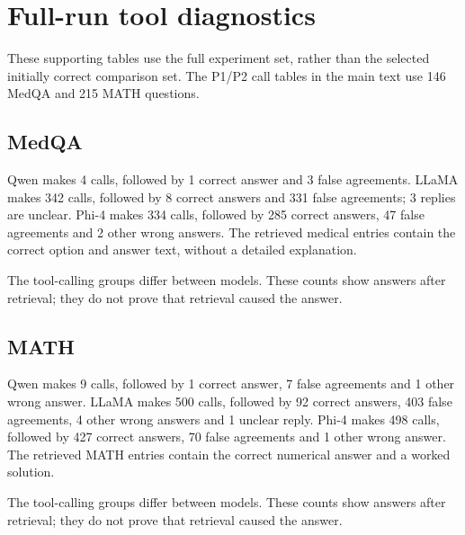 \documentclass{article}
\begin{document}
\section{Full-run tool diagnostics}
These supporting tables use the full experiment set, rather than the selected initially correct comparison set. The P1/P2 call tables in the main text use 146 MedQA and 215 MATH questions.

\subsection{MedQA}
\begin{table}[htbp]
\centering\small
\caption{MedQA tool-use diagnostics on all 171 questions, separate from the 146-question main comparison. Each model has 342 opportunities ($2\times 171$). Answer counts describe successful calls; every requested call succeeded.}
\label{tab:medqa-tools}

\end{table}

Qwen makes 4 calls, followed by 1 correct answer and 3 false agreements. LLaMA makes 342 calls, followed by 8 correct answers and 331 false agreements; 3 replies are unclear. Phi-4 makes 334 calls, followed by 285 correct answers, 47 false agreements and 2 other wrong answers. The retrieved medical entries contain the correct option and answer text, without a detailed explanation.

The tool-calling groups differ between models. These counts show answers after retrieval; they do not prove that retrieval caused the answer.


\subsection{MATH}
\begin{table}[htbp]
\centering\small
\caption{MATH tool-use diagnostics on all 250 questions, separate from the 215-question main comparison. Each model has 500 opportunities ($2\times 250$). Answer counts describe successful calls; every requested call succeeded.}
\label{tab:math-tools}

\end{table}

Qwen makes 9 calls, followed by 1 correct answer, 7 false agreements and 1 other wrong answer. LLaMA makes 500 calls, followed by 92 correct answers, 403 false agreements, 4 other wrong answers and 1 unclear reply. Phi-4 makes 498 calls, followed by 427 correct answers, 70 false agreements and 1 other wrong answer. The retrieved MATH entries contain the correct numerical answer and a worked solution.

The tool-calling groups differ between models. These counts show answers after retrieval; they do not prove that retrieval caused the answer.
\end{document}
